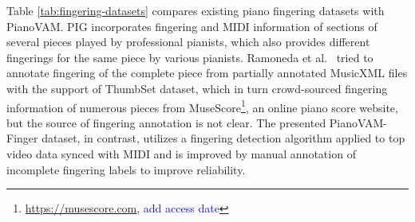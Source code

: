 \documentclass{article}
\newcommand{\alex}[1]{\textcolor{blue}{#1}}%
\newcommand{\jh}[1]{\textcolor{red}{#1}}
\begin{document}
Table \ref{tab:fingering-datasets} compares existing piano fingering datasets with PianoVAM. PIG \cite{InfoSci20Nakamura} incorporates fingering and MIDI information of sections of several pieces played by professional pianists, which also provides different fingerings for the same piece by various pianists. Ramoneda et al.\ \cite{MM22Ramoneda} tried to annotate fingering of the complete piece from partially annotated MusicXML files with the support of ThumbSet dataset, which in turn crowd-sourced fingering information of numerous pieces from MuseScore\footnote{\href{https://musescore.com}{https://musescore.com}, \alex{add access date}}, an online piano score website, but the source of fingering annotation is not clear. The presented PianoVAM-Finger dataset, in contrast, utilizes a fingering detection algorithm  applied to top video data synced with MIDI and is improved by manual annotation of incomplete fingering labels to improve reliability.  





\end{document}
